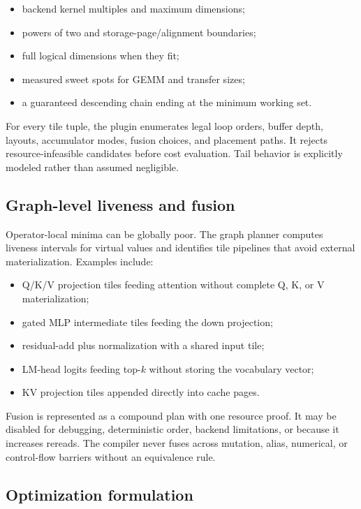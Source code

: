 \begin{itemize}
  \item backend kernel multiples and maximum dimensions;
  \item powers of two and storage-page/alignment boundaries;
  \item full logical dimensions when they fit;
  \item measured sweet spots for GEMM and transfer sizes;
  \item a guaranteed descending chain ending at the minimum working set.
\end{itemize}

For every tile tuple, the plugin enumerates legal loop orders, buffer depth, layouts, accumulator modes, fusion choices, and placement paths. It rejects resource-infeasible candidates before cost evaluation. Tail behavior is explicitly modeled rather than assumed negligible.

\subsection{Graph-level liveness and fusion}

Operator-local minima can be globally poor. The graph planner computes liveness intervals for virtual values and identifies tile pipelines that avoid external materialization. Examples include:

\begin{itemize}
  \item Q/K/V projection tiles feeding attention without complete Q, K, or V materialization;
  \item gated MLP intermediate tiles feeding the down projection;
  \item residual-add plus normalization with a shared input tile;
  \item LM-head logits feeding top-$k$ without storing the vocabulary vector;
  \item KV projection tiles appended directly into cache pages.
\end{itemize}

Fusion is represented as a compound plan with one resource proof. It may be disabled for debugging, deterministic order, backend limitations, or because it increases rereads. The compiler never fuses across mutation, alias, numerical, or control-flow barriers without an equivalence rule.

\subsection{Optimization formulation}

